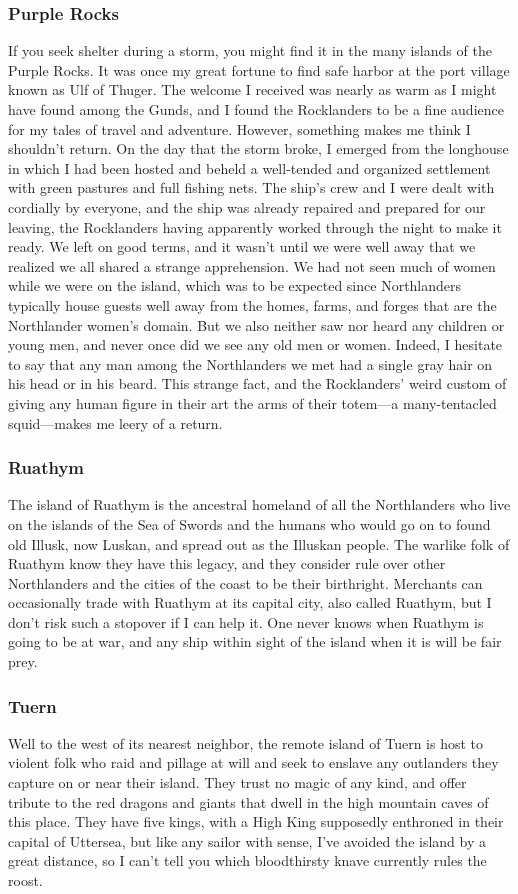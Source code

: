 \documentclass[10pt,a4paper,twoside,twocolumn,openany,bg=print,nodeprecatedcode]{dndbook}
\begin{document}
\subsubsection{Purple Rocks}
If you seek shelter during a storm, you might find it in the many islands of the Purple Rocks. It was once my great fortune to find safe harbor at the port village known as Ulf of Thuger. The welcome I received was nearly as warm as I might have found among the Gunds, and I found the Rocklanders to be a fine audience for my tales of travel and adventure. However, something makes me think I shouldn't return.
On the day that the storm broke, I emerged from the longhouse in which I had been hosted and beheld a well-tended and organized settlement with green pastures and full fishing nets. The ship's crew and I were dealt with cordially by everyone, and the ship was already repaired and prepared for our leaving, the Rocklanders having apparently worked through the night to make it ready.
We left on good terms, and it wasn't until we were well away that we realized we all shared a strange apprehension. We had not seen much of women while we were on the island, which was to be expected since Northlanders typically house guests well away from the homes, farms, and forges that are the Northlander women's domain. But we also neither saw nor heard any children or young men, and never once did we see any old men or women. Indeed, I hesitate to say that any man among the Northlanders we met had a single gray hair on his head or in his beard. This strange fact, and the Rocklanders' weird custom of giving any human figure in their art the arms of their totem—a many-tentacled squid—makes me leery of a return.
\subsubsection{Ruathym}
The island of Ruathym is the ancestral homeland of all the Northlanders who live on the islands of the Sea of Swords and the humans who would go on to found old Illusk, now Luskan, and spread out as the Illuskan people. The warlike folk of Ruathym know they have this legacy, and they consider rule over other Northlanders and the cities of the coast to be their birthright.
Merchants can occasionally trade with Ruathym at its capital city, also called Ruathym, but I don't risk such a stopover if I can help it. One never knows when Ruathym is going to be at war, and any ship within sight of the island when it is will be fair prey.
\subsubsection{Tuern}
Well to the west of its nearest neighbor, the remote island of Tuern is host to violent folk who raid and pillage at will and seek to enslave any outlanders they capture on or near their island. They trust no magic of any kind, and offer tribute to the red dragons and giants that dwell in the high mountain caves of this place. They have five kings, with a High King supposedly enthroned in their capital of Uttersea, but like any sailor with sense, I've avoided the island by a great distance, so I can't tell you which bloodthirsty knave currently rules the roost.
\end{document}
